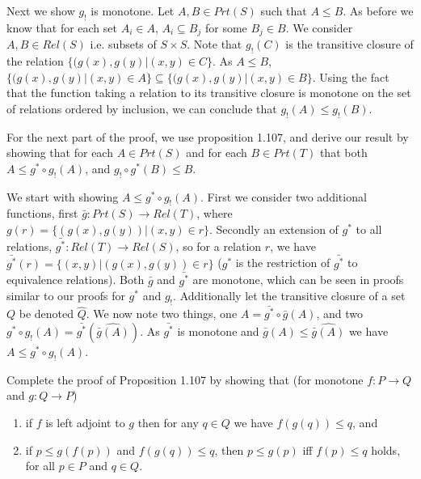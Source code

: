 Next we show $g_!$ is monotone.  Let $A, B\in Prt(S)$ such that $A\leq B$.  As before we know that for each set $A_i\in A$, $A_i\subseteq B_j$ for some $B_j\in B$. We consider $A,B\in Rel(S)$ i.e. subsets of $S\times S$. Note that $g_{!}(C)$  is the transitive closure of the relation $\{ (g(x),g(y)| (x, y)\in C\}$.  As $A\leq B$, $\{ (g(x),g(y)| (x, y)\in A\}\subseteq \{ (g(x),g(y)| (x, y)\in B\}$.  Using the fact that the function taking a relation to its transitive closure is monotone on the set of relations ordered by inclusion, we can conclude that $g_{!}(A)\leq g_{!}(B)$.

For the next part of the proof, we use proposition 1.107, and  derive our result by showing that for each $A\in Prt(S)$ and for each $B\in Prt(T)$ that both $A\leq g^*\circ g_!(A)$, and $g_!\circ g^*(B)\leq B$. 

 We start with showing $A\leq g^*\circ g_!(A)$. First we consider two additional functions, first $\bar{g}: Prt(S) \to Rel(T)$, where $g(r) = \{(g(x),g(y))| (x,y)\in r\}$.  Secondly an extension of $g^*$ to all relations, $\bar{g^*}:Rel(T)\to Rel(S)$, so for a relation $r$, we have $\bar{g^*}(r) = \{(x,y)| (g(x),g(y))\in r\}$ ($g^*$ is the restriction of $\bar{g^*}$ to equivalence relations).  Both $\bar{g}$ and $\bar{g^*}$ are monotone, which can be seen in proofs similar to our proofs for $g^*$ and $g_!$.  Additionally let the transitive closure of a set $Q$ be denoted $\hat{Q}$. We now note two things, one $A = \bar{g^*}\circ \bar{g}(A)$, and two $ g^*\circ g_!(A) = \bar{g^*}( \widehat{\bar{g}(A)})$.  As $\bar{g^*}$ is monotone and $\bar{g}(A)\leq \widehat{\bar{g}(A)}$ we have $A\leq g^*\circ g_!(A)$.



Complete the proof of Proposition 1.107 by showing that (for monotone $f:P\to Q$ and $g:Q\to P$)
\begin{enumerate}
	\item if $f$ is left adjoint to $g$ then for any $q\in Q$ we have $f(g(q))\leq q$, and
	\item if $p\leq g(f(p))$ and $f(g(q))\leq q$, then $p\leq g(p)$ iff $f(p)\leq q$ holds, for all $p\in P$ and $q\in Q$.
\end{enumerate}

\solution

